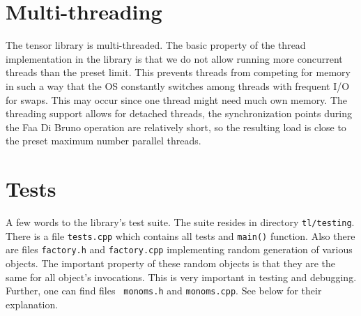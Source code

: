 \documentclass[11pt,a4paper]{article}
\begin{document}
\section{Multi-threading}

The tensor library is multi-threaded. The basic property of the
thread implementation in the library is that we do not allow running
more concurrent threads than the preset limit. This prevents threads
from competing for memory in such a way that the OS constantly switches
among threads with frequent I/O for swaps. This may occur since one
thread might need much own memory. The threading support allows for
detached threads, the synchronization points during the Faa Di Bruno
operation are relatively short, so the resulting load is close to the
preset maximum number parallel threads.

\section{Tests}

A few words to the library's test suite. The suite resides in
directory {\tt tl/testing}. There is a file {\tt tests.cpp} which
contains all tests and {\tt main()} function. Also there are files
{\tt factory.h} and {\tt factory.cpp} implementing random generation
of various objects. The important property of these random objects is
that they are the same for all object's invocations. This is very
important in testing and debugging. Further, one can find files {\tt
monoms.h} and {\tt monoms.cpp}. See below for their explanation.
\end{document}
